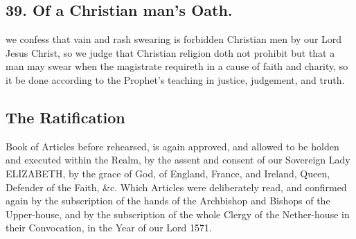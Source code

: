 \subsection{39. Of a Christian man's Oath.}
 we confess that vain and rash swearing is forbidden Christian men by our Lord Jesus Christ, so we judge that Christian religion doth not prohibit but that a man may swear when the magistrate requireth in a cause of faith and charity, so it be done according to the Prophet's teaching in justice, judgement, and truth.

\subsection{The Ratification}
 Book of Articles before rehearsed, is again approved, and allowed to be holden and executed within the Realm, by the assent and consent of our Sovereign Lady ELIZABETH, by the grace of God, of England, France, and Ireland, Queen, Defender of the Faith, \&c. Which Articles were deliberately read, and confirmed again by the subscription of the hands of the Archbishop and Bishops of the Upper-house, and by the subscription of the whole Clergy of the Nether-house in their Convocation, in the Year of our Lord 1571.

\clearpage
